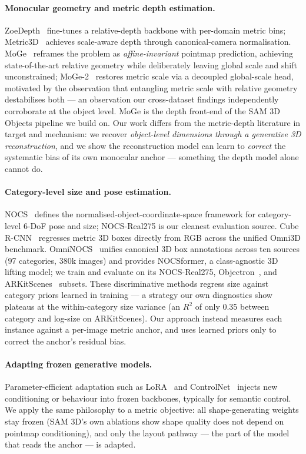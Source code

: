 \documentclass[runningheads]{llncs}
\begin{document}
\paragraph{Monocular geometry and metric depth estimation.}
ZoeDepth~\cite{zoedepth} fine-tunes a relative-depth backbone with per-domain metric bins;
Metric3D~\cite{metric3d} achieves scale-aware depth through canonical-camera normalisation.
MoGe~\cite{moge} reframes the problem as \emph{affine-invariant} pointmap prediction,
achieving state-of-the-art relative geometry while deliberately leaving global scale and
shift unconstrained; MoGe-2~\cite{moge2} restores metric scale via a decoupled global-scale
head, motivated by the observation that entangling metric scale with relative geometry
destabilises both --- an observation our cross-dataset findings independently corroborate at
the object level. MoGe is the depth front-end of the SAM 3D Objects pipeline we build on.
Our work differs from the metric-depth literature in target and mechanism: we recover
\emph{object-level dimensions through a generative 3D reconstruction}, and we show the
reconstruction model can learn to \emph{correct} the systematic bias of its own monocular
anchor --- something the depth model alone cannot do.

\paragraph{Category-level size and pose estimation.}
NOCS~\cite{nocs} defines the normalised-object-coordinate-space framework for category-level
6-DoF pose and size; NOCS-Real275 is our cleanest evaluation source. Cube
R-CNN~\cite{omni3d} regresses metric 3D boxes directly from RGB across the unified Omni3D
benchmark. OmniNOCS~\cite{omninocs} unifies canonical 3D box annotations across ten sources
(97 categories, 380k images) and provides NOCSformer, a class-agnostic 3D lifting model; we
train and evaluate on its NOCS-Real275, Objectron~\cite{objectron}, and
ARKitScenes~\cite{arkitscenes} subsets. These discriminative methods regress size against
category priors learned in training --- a strategy our own diagnostics show plateaus at the
within-category size variance (an $R^2$ of only 0.35 between category and log-size on
ARKitScenes). Our approach instead measures each instance against a per-image metric anchor,
and uses learned priors only to correct the anchor's residual bias.

\paragraph{Adapting frozen generative models.}
Parameter-efficient adaptation such as LoRA~\cite{lora} and ControlNet~\cite{controlnet}
injects new conditioning or behaviour into frozen backbones, typically for semantic control.
We apply the same philosophy to a metric objective: all shape-generating weights stay
frozen (SAM 3D's own ablations show shape quality does not depend on pointmap conditioning),
and only the layout pathway --- the part of the model that reads the anchor --- is adapted.
\end{document}
